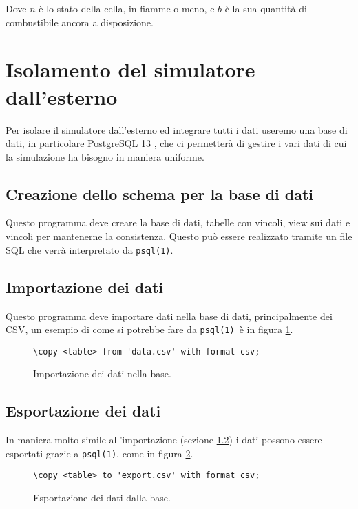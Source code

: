 \documentclass[draft]{article}
\newcommand{\eng}[1]{\foreignlanguage{english}{#1}} %
\newcommand{\psql}{\texttt{psql(1)}}
\begin{document}
Dove $n$ è lo stato della cella, in fiamme o meno, e $b$ è la sua quantità di
combustibile ancora a disposizione.

\section{Isolamento del simulatore dall'esterno}

Per isolare il simulatore dall'esterno ed integrare tutti i dati useremo una
base di dati, in particolare PostgreSQL 13 \cite{psql}, che ci permetterà di
gestire i vari dati di cui la simulazione ha bisogno in maniera uniforme.

\subsection{Creazione dello schema per la base di dati}

Questo programma deve creare la base di dati, tabelle con vincoli, \eng{view}
sui dati e vincoli per mantenerne la consistenza. Questo può essere realizzato
tramite un file SQL che verrà interpretato da \psql.

\subsection{Importazione dei dati}
\label{sec:import}

Questo programma deve importare dati nella base di dati, principalmente dei CSV,
un esempio di come si potrebbe fare da \psql\ è in figura \ref{fig:import}.

\begin{figure}
\centering\verb+\copy <table> from 'data.csv' with format csv;+
\caption{Importazione dei dati nella base.}
\label{fig:import}
\end{figure}

\subsection{Esportazione dei dati}

In maniera molto simile all'importazione (sezione \ref{sec:import}) i dati
possono essere esportati grazie a \psql, come in figura \ref{fig:export}.

\begin{figure}
\centering\verb+\copy <table> to 'export.csv' with format csv;+
\caption{Esportazione dei dati dalla base.}
\label{fig:export}
\end{figure}
\end{document}
